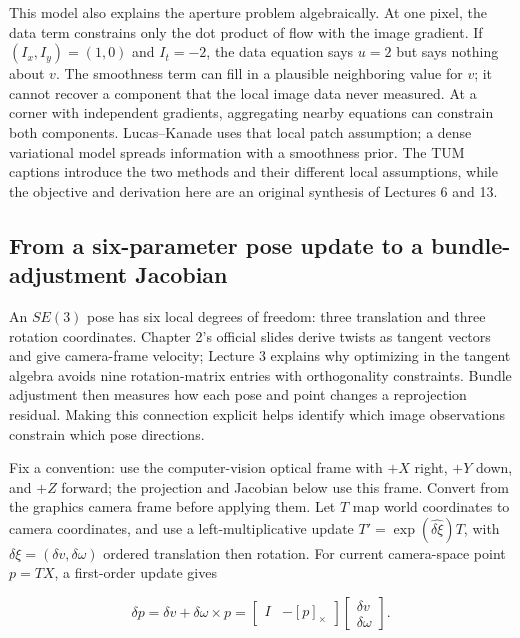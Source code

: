 This model also explains the aperture problem algebraically. At one pixel, the data term constrains only the dot product of flow with the image gradient. If \((I_x,I_y)=(1,0)\) and \(I_t=-2\), the data equation says \(u=2\) but says nothing about \(v\). The smoothness term can fill in a plausible neighboring value for \(v\); it cannot recover a component that the local image data never measured. At a corner with independent gradients, aggregating nearby equations can constrain both components. Lucas--Kanade uses that local patch assumption; a dense variational model spreads information with a smoothness prior. The TUM captions introduce the two methods and their different local assumptions, while the objective and derivation here are an original synthesis of Lectures 6 and 13.

\subsection{From a six-parameter pose update to a bundle-adjustment Jacobian}\label{02-foundations-ii-ch036-from-a-six-parameter-pose-update-to-a-bundle-adjustment-jacobian}

\hypertarget{02-foundations-ii-ch036-from-a-six-parameter-pose-update-to-a-bundle-adjustment-jacobian}{}

An \(SE(3)\) pose has six local degrees of freedom: three translation and three rotation coordinates. Chapter 2's official slides derive twists as tangent vectors and give camera-frame velocity; Lecture 3 explains why optimizing in the tangent algebra avoids nine rotation-matrix entries with orthogonality constraints. Bundle adjustment then measures how each pose and point changes a reprojection residual. Making this connection explicit helps identify which image observations constrain which pose directions.

Fix a convention: use the computer-vision optical frame with \(+X\) right, \(+Y\) down, and \(+Z\) forward; the projection and Jacobian below use this frame. Convert from the graphics camera frame before applying them. Let \(T\) map world coordinates to camera coordinates, and use a left-multiplicative update \(T'=\exp(\widehat{\delta\xi})T\), with \(\delta\xi=(\delta v,\delta\omega)\) ordered translation then rotation. For current camera-space point \(p=TX\), a first-order update gives

\[
\delta p=\delta v+\delta\omega\times p
=\begin{bmatrix}I&-[p]_\times\end{bmatrix}
\begin{bmatrix}\delta v\\\delta\omega\end{bmatrix}.
\]

